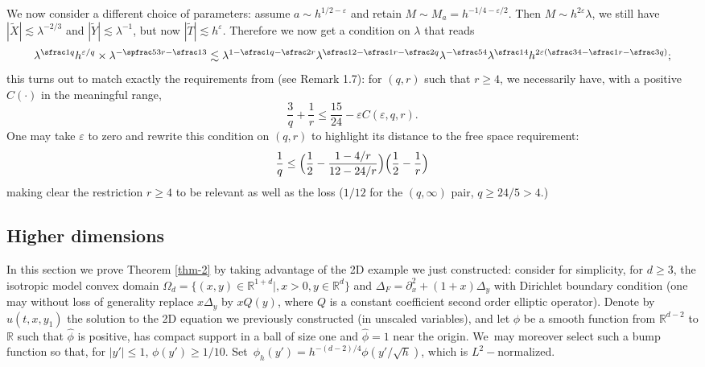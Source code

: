 \medskip
We now consider a different choice of parameters: assume $a\sim h^{1/2-\varepsilon}$ and retain $M\sim M_{a}=h^{-1/4-\varepsilon/2}$. Then $M\sim h^{2\varepsilon}\lambda$, we still have $|\tilde X|\lesssim \lambda^{-2/3}$ and $|\tilde Y|\lesssim \lambda^{-1}$, but now $|\tilde T|\lesssim h^{\varepsilon}$. Therefore we now get a condition on $\lambda$ that reads
\[
\lambda^{\sfrac 1 q}h^{\varepsilon/q} \times \lambda^{-\spfrac 5{3r}-\sfrac 1 3}
\lesssim \lambda^{1-\sfrac 1 q-\sfrac 2 r} \lambda^{\sfrac 1 2 -\sfrac 1 r -\sfrac 2 q} \lambda^{-\sfrac 5 4} \lambda^{\sfrac 1 {4}}h^{2\varepsilon(\sfrac 3 4 -\sfrac 1 r -\sfrac 3q)};
\]
this turns out to match exactly the requirements from \cite{doi} (see Remark 1.7): for $(q,r)$ such that $r\geq 4$, we necessarily have, with a positive $C(\cdot)$ in the meaningful range,
\[
\frac 3 q +\frac 1 r \leq \frac {15} {24}-\varepsilon C(\varepsilon,q,r).
\]
One may take $\varepsilon$ to zero and rewrite this condition on $(q,r)$ to highlight its distance to the free space requirement:
\begin{equation*}
\label{eq:doi2d}
\frac 1 q \leq \Bigl(\frac 1 2 -\frac {1-4/r}{12-24/r}\Bigr) \Bigl(\frac 1 2 -\frac 1 r\Bigr)
\end{equation*}
making clear the restriction $r\geq 4$ to be relevant as well as the loss ($1/12$ for the $(q,\infty)$ pair, \eg $q\geq 24/5>4$.)

\subsection{Higher dimensions}
In this section we prove Theorem \ref{thm-2} by taking advantage of the 2D example we just constructed: consider for simplicity, for $d\geq 3$, the isotropic model convex domain $\Omega_d=\{(x,y)\in\mathbb{R}^{1+d}|, x>0,y\in\mathbb{R}^{d}\}$ and
$\Delta_F=\partial^{2}_{x}+(1+x)\Delta_{y}$ with Dirichlet boundary condition (one may without loss of generality replace $x\Delta_{y}$ by $xQ(y)$, where $Q$ is a constant coefficient second order elliptic operator). Denote by $u(t,x,y_{1})$ the solution to the 2D equation we previously constructed (in unscaled variables), and let $\phi$ be a smooth function from $\mathbb{R}^{d-2}$ to $\mathbb{R}$ such that $\hat \phi$ is positive, has compact support in a ball of size one and $\hat \phi=1$ near the origin. We~may moreover select such a bump function so that, for $|y'|\leq 1$, $\phi(y')\geq 1/10$. Set~$\phi_{h}(y')= h^{-(d-2)/4}\phi(y'/\sqrt h)$, which is $L^{2}-$normalized.

